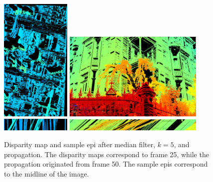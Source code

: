 \documentclass{article}
\theoremstyle{definition}
\begin{document}
\begin{figure}[ht]
  \centering
  \includegraphics[width=0.3\textwidth]{images/1520867757275_dmap_025.png}
  \includegraphics[width=0.6\textwidth]{images/1520877118843_dmap_025.png} \\
  
  \includegraphics[width=0.3\textwidth]{images/1520867757275_epi_colored.png}
  \includegraphics[width=0.6\textwidth]{images/1520877118843_epi_colored.png}
  \caption{Disparity map and sample epi after median filter, $k=5$, and propagation. The disparity maps correspond to frame 25, while the propagation originated from frame 50. The sample epis correspond to the midline of the image.}
  \label{fig:propagation}
\end{figure}







\clearpage


\end{document}
